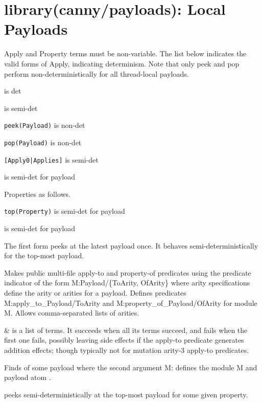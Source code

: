 \chapter{library(canny/payloads): Local Payloads}\label{sec:payloads}

Apply and Property terms must be non-variable. The list below
indicates the valid forms of Apply, indicating determinism. Note that
only peek and pop perform non-deterministically for all thread-local
payloads.

\begin{shortlist}
    \item {} is det
    \item {} is semi-det
    \item \verb$peek(Payload)$ is non-det
    \item \verb$pop(Payload)$ is non-det
    \item \verb$[Apply0|Applies]$ is semi-det
    \item {} is semi-det for payload
\end{shortlist}

Properties as follows.

\begin{shortlist}
    \item \verb$top(Property)$ is semi-det for payload
    \item {} is semi-det for payload
\end{shortlist}

The first form  peeks at the latest payload once. It behaves
semi-deterministically for the top-most payload.\vspace{0.7cm}

\begin{description}
Makes public multi-file apply-to and property-of predicates using
the predicate indicator  of the form M:Payload/\{ToArity, OfArity\}
where arity specifications define the arity or arities for a
payload. Defines predicates M:apply_to_Payload/ToArity and
M:property_of_Payload/OfArity for module M. Allows comma-separated
lists of arities.

\nodescription

\begin{arguments}
 & is a list of  terms. It succeeds when all its
 terms succeed, and fails when the first one fails, possibly
leaving side effects if the apply-to predicate generates addition
effects; though typically not for mutation arity-3 apply-to
predicates. \\
\end{arguments}

Finds  of some payload where the second argument M:
defines the module M and payload atom .

  peeks semi-deterministically at the top-most payload
for some given property.
\end{description}

